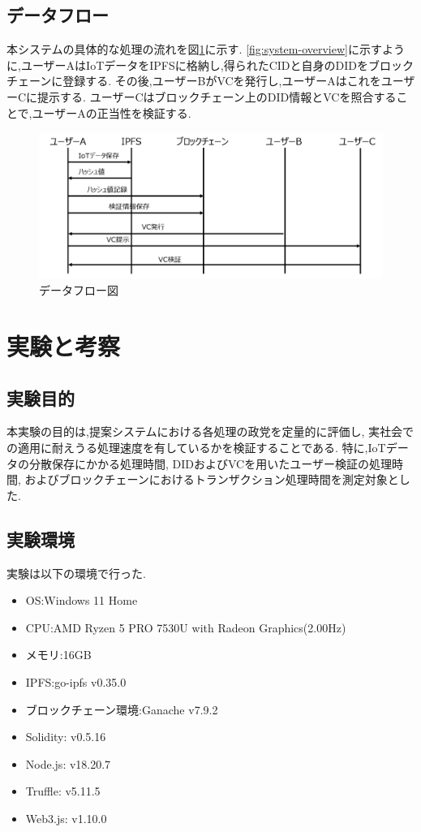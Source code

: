 \documentclass[a4paper,9pt,twocolumn]{ltjsarticle} %
\begin{document}
\subsection{データフロー}
本システムの具体的な処理の流れを図\ref{fig:system-flow}に示す.
\ref{fig:system-overview}に示すように,ユーザーAはIoTデータをIPFSに格納し,得られたCIDと自身のDIDをブロックチェーンに登録する.
その後,ユーザーBがVCを発行し,ユーザーAはこれをユーザーCに提示する.
ユーザーCはブロックチェーン上のDID情報とVCを照合することで,ユーザーAの正当性を検証する.

\begin{figure}[H]
  \centering
  \includegraphics[width=0.95\linewidth]{figure2.png}
  \caption{データフロー図}
  \label{fig:system-flow}
\end{figure}

\section{実験と考察}

\subsection{実験目的}
本実験の目的は,提案システムにおける各処理の政党を定量的に評価し,
実社会での適用に耐えうる処理速度を有しているかを検証することである.
特に,IoTデータの分散保存にかかる処理時間,
DIDおよびVCを用いたユーザー検証の処理時間,
およびブロックチェーンにおけるトランザクション処理時間を測定対象とした.

\subsection{実験環境}
実験は以下の環境で行った.
\begin{itemize}
  \item OS:Windows 11 Home
  \item CPU:AMD Ryzen 5 PRO 7530U with Radeon Graphics(2.00Hz)
  \item メモリ:16GB
  \item IPFS:go-ipfs v0.35.0
  \item ブロックチェーン環境:Ganache v7.9.2
  \item Solidity: v0.5.16
  \item Node.js: v18.20.7
  \item Truffle: v5.11.5
  \item Web3.js: v1.10.0
\end{itemize}
\end{document}
